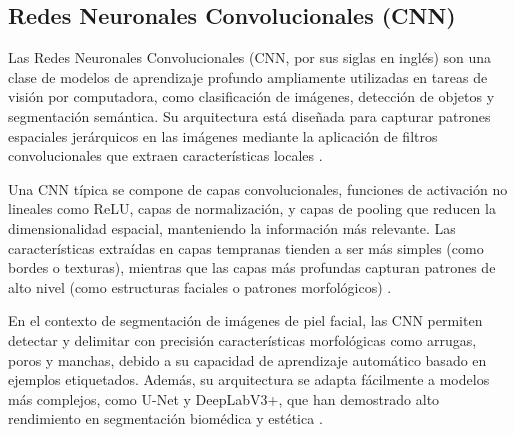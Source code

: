 \subsection{Redes Neuronales Convolucionales (CNN)}


Las Redes Neuronales Convolucionales (CNN, por sus siglas en inglés) son una clase de modelos de aprendizaje profundo ampliamente utilizadas en tareas de visión por computadora, como clasificación de imágenes, detección de objetos y segmentación semántica. Su arquitectura está diseñada para capturar patrones espaciales jerárquicos en las imágenes mediante la aplicación de filtros convolucionales que extraen características locales \cite{lecun1998gradient, krizhevsky2012imagenet, ronneberger2015unet}.

Una CNN típica se compone de capas convolucionales, funciones de activación no lineales como ReLU, capas de normalización, y capas de pooling que reducen la dimensionalidad espacial, manteniendo la información más relevante. Las características extraídas en capas tempranas tienden a ser más simples (como bordes o texturas), mientras que las capas más profundas capturan patrones de alto nivel (como estructuras faciales o patrones morfológicos) \cite{lecun1998gradient, krizhevsky2012imagenet, ronneberger2015unet}.

En el contexto de segmentación de imágenes de piel facial, las CNN permiten detectar y delimitar con precisión características morfológicas como arrugas, poros y manchas, debido a su capacidad de aprendizaje automático basado en ejemplos etiquetados. Además, su arquitectura se adapta fácilmente a modelos más complejos, como U-Net y DeepLabV3+, que han demostrado alto rendimiento en segmentación biomédica y estética \cite{lecun1998gradient, krizhevsky2012imagenet, ronneberger2015unet}.


